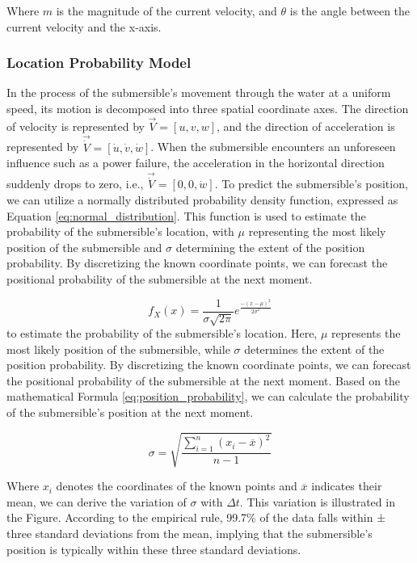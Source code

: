\documentclass[12pt]{article}
\begin{document}
Where $m$ is the magnitude of the current velocity, and $\theta$ is the angle between the current velocity and the x-axis.

\subsubsection{Location Probability Model}

In the process of the submersible's movement through the water at a uniform speed, its motion is decomposed into three spatial coordinate axes. The direction of velocity is represented by $\vec{V}=[u,v,w]$, and the direction of acceleration is represented by $\vec{\dot{V}}=[\dot{u},\dot{v},\dot{w}]$. When the submersible encounters an unforeseen influence such as a power failure, the acceleration in the horizontal direction suddenly drops to zero, i.e., $\vec{\dot{V}}=[0,0,\dot{w}]$. To predict the submersible's position, we can utilize a normally distributed probability density function, expressed as Equation \ref{eq:normal_distribution}. This function is used to estimate the probability of the submersible's location, with $\mu$ representing the most likely position of the submersible and $\sigma$ determining the extent of the position probability. By discretizing the known coordinate points, we can forecast the positional probability of the submersible at the next moment.

\begin{equation}
    f_X(x)=\frac{1}{\sigma\sqrt{2\pi}}e^{\frac{-(x-\mu)^2}{2\sigma^2}} \label{eq:normal_distribution}
\end{equation}
to estimate the probability of the submersible's location. Here, $\mu$ represents the most likely position of the submersible, while $\sigma$ determines the extent of the position probability. By discretizing the known coordinate points, we can forecast the positional probability of the submersible at the next moment. Based on the mathematical Formula \ref{eq:position_probability}, we can calculate the probability of the submersible's position at the next moment.

\begin{equation}
    \sigma=\sqrt{\frac{\sum_{i=1}^n{(x_i-\overline{x})^2}}{n-1}} \label{eq:position_probability}
\end{equation}

Where $x_i$ denotes the coordinates of the known points and $\overline{x}$ indicates their mean, we can derive the variation of $\sigma$ with $\Delta t$. This variation is illustrated in the Figure. According to the empirical rule, 99.7\% of the data falls within ± three standard deviations from the mean, implying that the submersible's position is typically within these three standard deviations.
\end{document}
